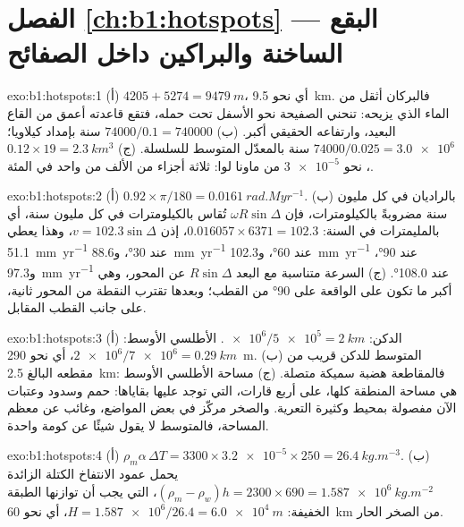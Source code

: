 \section*{الفصل \ref{ch:b1:hotspots} --- البقع الساخنة والبراكين داخل الصفائح}

\begin{solution}{exo:b1:hotspots:1}
(أ) $4205 + 5274 = \qty{9479}{m}$، أي نحو \qty{9.5}{km}. فالبركان أثقل من الماء الذي يزيحه: تنحني الصفيحة نحو الأسفل تحت حمله، فتقع قاعدته أعمق من القاع البعيد، وارتفاعه الحقيقي أكبر. (ب) $74000/0.1 = \num{740000}$ سنة بإمداد كيلاويا؛ $74000/0.025 = \num{3.0e6}$ سنة بالمعدّل المتوسط للسلسلة. (ج) $0.12\times19 = \qty{2.3}{km^3}$، نحو $\num{3e-5}$ من ماونا لوا: ثلاثة أجزاء من الألف من واحد في المئة.
\end{solution}

\begin{solution}{exo:b1:hotspots:2}
(أ) $0.92\times\pi/180 = \qty{0.0161}{rad.Myr^{-1}}$. (ب) بالراديان في كل مليون سنة مضروبةً بالكيلومترات، فإن $\omega R\sin\Delta$ تُقاس بالكيلومترات في كل مليون سنة، أي بالمليمترات في السنة: $0.016057\times6371 = 102.3$، إذن $v = 102.3\sin\Delta$، وهذا يعطي \qty{51.1}{mm.yr^{-1}} عند \ang{30}، و\qty{88.6}{mm.yr^{-1}} عند \ang{60}، و\qty{102.3}{mm.yr^{-1}} عند \ang{90}، و\qty{97.3}{mm.yr^{-1}} عند \ang{108.0}. (ج) السرعة متناسبة مع البعد $R\sin\Delta$ عن المحور، وهي أكبر ما تكون على  الواقعة على \ang{90} من القطب؛ وبعدها تقترب النقطة من المحور ثانية، على جانب القطب المقابل.
\end{solution}

\begin{solution}{exo:b1:hotspots:3}
(أ) الدكن: $\num{e6}/\num{5e5} = \qty{2}{km}$. الأطلسي الأوسط: $\num{2e6}/\num{7e6} = \qty{0.29}{km}$، أي نحو \qty{290}{m}. (ب) المتوسط للدكن قريب من مقطعه البالغ \qty{2.5}{km}: فالمقاطعة هضبة سميكة متصلة. (ج) مساحة الأطلسي الأوسط هي مساحة المنطقة كلها، على أربع قارات، التي توجد عليها بقاياها: حمم وسدود وعتبات الآن مفصولة بمحيط وكثيرة التعرية. والصخر مركّز في بعض المواضع، وغائب عن معظم المساحة، فالمتوسط لا يقول شيئًا عن كومة واحدة.
\end{solution}

\begin{solution}{exo:b1:hotspots:4}
(أ) $\rho_m\alpha\,\Delta T = 3300\times\num{3.2e-5}\times250 =
\qty{26.4}{kg.m^{-3}}$. (ب) يحمل عمود الانتفاخ الكتلة الزائدة $(\rho_m - \rho_w)h = 2300\times690 = \qty{1.587e6}{kg.m^{-2}}$، التي يجب أن توازنها الطبقة الخفيفة: $H = \num{1.587e6}/26.4 = \qty{6.0e4}{m}$، أي نحو \qty{60}{km} من الصخر الحار.
\end{solution}

